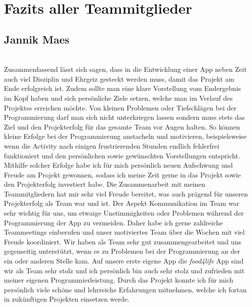 \section{Fazits aller Teammitglieder}
\label{concept}

\subsection{Jannik Maes}\\
Zusammenfassend lässt sich sagen, dass in die Entwicklung einer App neben Zeit auch viel Disziplin und Ehrgeiz gesteckt werden muss, damit das Projekt am Ende erfolgreich ist. Zudem sollte man eine klare Vorstellung vom Endergebnis im Kopf haben und sich persönliche Ziele setzen, welche man im Verlauf des Projektes erreichen möchte. Von kleinen Problemen oder Tiefschlägen bei der Programmierung darf man sich nicht unterkriegen lassen sondern muss stets das Ziel und den Projekterfolg für das gesamte Team vor Augen halten. So können kleine Erfolge bei der Programmierung anstacheln und motivieren, beispielsweise wenn die Activity nach einigen frustrierenden Stunden endlich fehlerfrei funktioniert und den persönlichen sowie gewünschten Vorstellungen entspricht. Mithilfe solcher Erfolge habe ich für mich persönlich neuen Aufschwung und Freude am Projekt gewonnen, sodass ich meine Zeit gerne in das Projekt sowie den Projekterfolg investiert habe. Die Zusammenarbeit mit meinen Teammitgliedern hat mir sehr viel Freude bereitet, was auch prägend für unseren Projekterfolg als Team war und ist. Der Aspekt Kommunikation im Team war sehr wichtig für uns, um etwaige Unstimmigkeiten oder Problemen während der Programmierung der App zu vermeiden. Daher habe ich gerne zahlreiche Teammeetings einberufen und unser motiviertes Team über die Wochen mit viel Freude koordiniert. Wir haben als Team sehr gut zusammengearbeitet und uns gegenseitig unterstützt, wenn es zu Problemen bei der Programmierung an der ein oder anderen Stelle kam. Auf unsere erste eigene App die 
\textit{food4life} App sind wir als Team sehr stolz und ich persönlich bin auch sehr stolz und zufrieden mit meiner eigenen Programmierleistung. Durch das Projekt konnte ich für mich persönlich viele schöne und lehrreiche Erfahrungen mitnehmen, welche ich fortan in zukünftigen Projekten einsetzen werde.

\\
